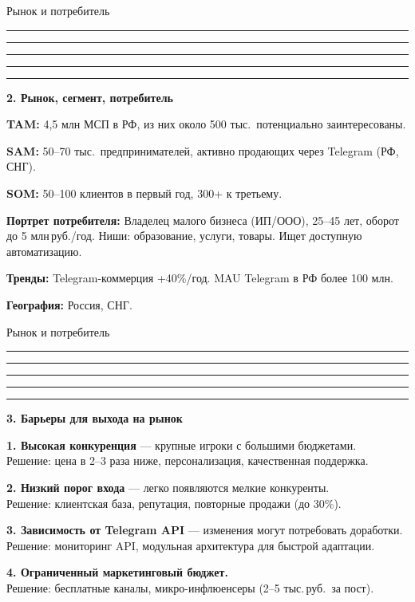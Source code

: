 \documentclass[aspectratio=169, 11pt]{beamer}
\newcommand{\cbar}{%
  \textcolor{cPink}{\rule{0.2\linewidth}{2pt}}%
  \textcolor{cPurple}{\rule{0.2\linewidth}{2pt}}%
  \textcolor{cRed}{\rule{0.2\linewidth}{2pt}}%
  \textcolor{cOrange}{\rule{0.2\linewidth}{2pt}}%
  \textcolor{cBlue}{\rule{0.2\linewidth}{2pt}}\par\medskip}
\newcommand{\R}{\,руб.}
\begin{document}
\begin{frame}{Рынок и потребитель}
\cbar
\textbf{2. Рынок, сегмент, потребитель}

\smallskip
\textbf{TAM:} 4,5 млн МСП в РФ, из них около 500 тыс.\ потенциально заинтересованы.

\textbf{SAM:} 50--70 тыс.\ предпринимателей, активно продающих через Telegram (РФ, СНГ).

\textbf{SOM:} 50--100 клиентов в первый год, 300+ к третьему.

\medskip
\textbf{\textcolor{cGray}{Портрет потребителя:}}
Владелец малого бизнеса (ИП/ООО), 25--45 лет, оборот до 5 млн\R/год. Ниши: образование, услуги, товары. Ищет доступную автоматизацию.

\medskip
\textbf{\textcolor{cGray}{Тренды:}} Telegram-коммерция +40\%/год. MAU Telegram в РФ более 100 млн.

\textbf{\textcolor{cGray}{География:}} Россия, СНГ.
\end{frame}

\begin{frame}{Рынок и потребитель}
\cbar
\textbf{3. Барьеры для выхода на рынок}

\medskip
\textbf{1. Высокая конкуренция} --- крупные игроки с большими бюджетами.\\
\textcolor{cRed}{Решение: цена в 2--3 раза ниже, персонализация, качественная поддержка.}

\medskip
\textbf{2. Низкий порог входа} --- легко появляются мелкие конкуренты.\\
\textcolor{cRed}{Решение: клиентская база, репутация, повторные продажи (до 30\%).}

\medskip
\textbf{3. Зависимость от Telegram API} --- изменения могут потребовать доработки.\\
\textcolor{cRed}{Решение: мониторинг API, модульная архитектура для быстрой адаптации.}

\medskip
\textbf{4. Ограниченный маркетинговый бюджет.}\\
\textcolor{cRed}{Решение: бесплатные каналы, микро-инфлюенсеры (2--5 тыс.\R\ за пост).}
\end{frame}
\end{document}
